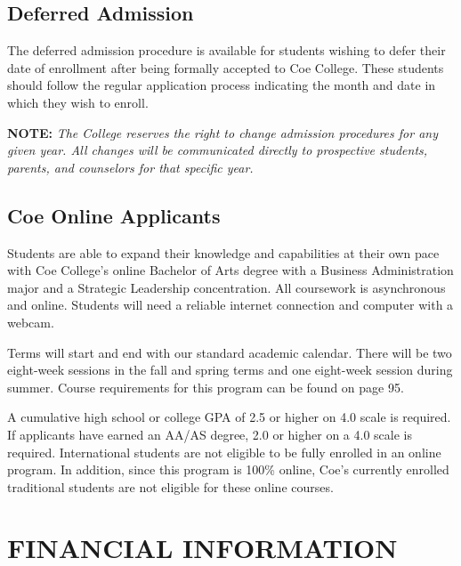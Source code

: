 \documentclass[
  letterpaper,
]{scrbook}
\renewcommand{\part}[1]{\addcontentsline{toc}{part}{#1}}
\begin{document}
\section{Deferred Admission}\label{deferred-admission}

The deferred admission procedure is available for students wishing to
defer their date of enrollment after being formally accepted to Coe
College. These students should follow the regular application process
indicating the month and date in which they wish to enroll.

\textbf{NOTE:} \emph{The College reserves the right to change admission
procedures for any given year. All changes will be communicated directly
to prospective students, parents, and counselors for that specific
year.}

\section{Coe Online Applicants}\label{coe-online-applicants}

Students are able to expand their knowledge and capabilities at their
own pace with Coe College's online Bachelor of Arts degree with a
Business Administration major and a Strategic Leadership concentration.
All coursework is asynchronous and online. Students will need a reliable
internet connection and computer with a webcam.

Terms will start and end with our standard academic calendar. There will
be two eight-week sessions in the fall and spring terms and one
eight-week session during summer. Course requirements for this program
can be found on page 95.

A cumulative high school or college GPA of 2.5 or higher on 4.0 scale is
required. If applicants have earned an AA/AS degree, 2.0 or higher on a
4.0 scale is required. International students are not eligible to be
fully enrolled in an online program. In addition, since this program is
100\% online, Coe's currently enrolled traditional students are not
eligible for these online courses.

\part{FINANCIAL RESOURCES}

\chapter{FINANCIAL INFORMATION}\label{sec-financial-information}
\end{document}
